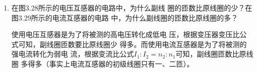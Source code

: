 \begin{enumerate}
\begin{solution}
    设原线圈匝数为$n_1$, 副线圈匝数为$n_2$, 原线圈电压
    为$U_1$, 副线圈电压为$U_2$. 根据变压比公式$\dfrac{U_1}{U_2}=\dfrac{n_1}{n_2}$，
    可得
\[n_1=\frac{U_1}{U_2}\cdot n_2=\frac{220}{55}\x 400=1600\text{（匝）}\]

\end{solution}

\item 在图3.28所示的电压互感器的电路中，为什么副线
圈的匝数比原线圈的少？在图3.29所示的电流互感器的电路
中，为什么副线圈的匝数比原线圈的多？


\begin{solution}
使用电压互感器是为了将被测的高电压转化成低电
压，根据变压器变压比公式可知，副线圈匝数要比原线圈少
得多。而使用电流互感器是为了将被测的强电流转化为弱电
流，根据变流比公式$I_1:I_2=n_2:n_1$可知，副线圈匝数比原线圈
多得多（事实上电流互感器的初级线圈只有一、二匝）。
\end{solution}

\end{enumerate}



